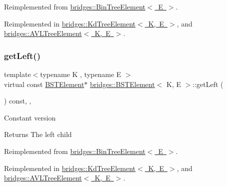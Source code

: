 Reimplemented from \mbox{\hyperlink{classbridges_1_1_bin_tree_element_a8367ce9c4eea814637edc2c56efbde25}{bridges\+::\+Bin\+Tree\+Element$<$ E $>$}}.



Reimplemented in \mbox{\hyperlink{classbridges_1_1_kd_tree_element_ad7db63a4f82f5252c7e0809ac6486cb4}{bridges\+::\+Kd\+Tree\+Element$<$ K, E $>$}}, and \mbox{\hyperlink{classbridges_1_1_a_v_l_tree_element_a7b5d05660da127f5f6164120d9846d90}{bridges\+::\+A\+V\+L\+Tree\+Element$<$ K, E $>$}}.

\mbox{\label{classbridges_1_1_b_s_t_element_a2abcfb991f6cc377da2bd9217319fc9c}} 
\subsubsection{\texorpdfstring{get\+Left()}{getLeft()}\hspace{0.1cm}{\footnotesize\ttfamily [2/2]}}
{\footnotesize\ttfamily template$<$typename K , typename E $>$ \\
virtual const \mbox{\hyperlink{classbridges_1_1_b_s_t_element}{B\+S\+T\+Element}}$\ast$ \mbox{\hyperlink{classbridges_1_1_b_s_t_element}{bridges\+::\+B\+S\+T\+Element}}$<$ K, E $>$\+::get\+Left (\begin{DoxyParamCaption}{ }\end{DoxyParamCaption}) const\hspace{0.3cm}{\ttfamily [inline]}, {\ttfamily [override]}, {\ttfamily [virtual]}}

Constant version

\begin{DoxyReturn}{Returns}
The left child 
\end{DoxyReturn}


Reimplemented from \mbox{\hyperlink{classbridges_1_1_bin_tree_element_a0841701bd7d4b444dafbbdfefed067a5}{bridges\+::\+Bin\+Tree\+Element$<$ E $>$}}.



Reimplemented in \mbox{\hyperlink{classbridges_1_1_kd_tree_element_ab58af4ca67cb3869c279bfc11952c070}{bridges\+::\+Kd\+Tree\+Element$<$ K, E $>$}}, and \mbox{\hyperlink{classbridges_1_1_a_v_l_tree_element_a61e075db5414b7bd6f52d657401acda3}{bridges\+::\+A\+V\+L\+Tree\+Element$<$ K, E $>$}}.

